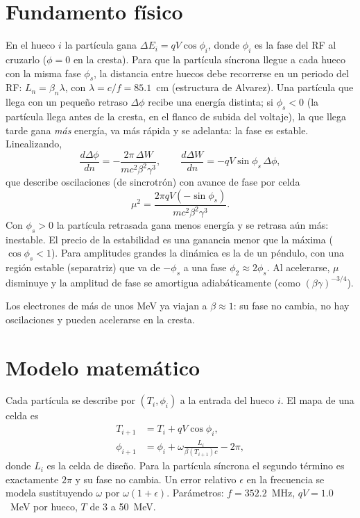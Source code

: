 \documentclass[11pt,a4paper]{article}
\begin{document}
\section{Fundamento físico}

En el hueco $i$ la partícula gana $\Delta E_i=qV\cos\phi_i$, donde $\phi_i$ es la fase del RF al cruzarlo ($\phi=0$ en la cresta).
Para que la partícula síncrona llegue a cada hueco con la misma fase $\phi_s$, la distancia entre huecos debe recorrerse en un
periodo del RF: $L_n=\beta_n\lambda$, con $\lambda=c/f=\num{85.1}$~cm (estructura de Alvarez). Una partícula que llega con un pequeño
retraso $\Delta\phi$ recibe una energía distinta; si $\phi_s<0$ (la partícula llega antes de la cresta, en el flanco de subida del
voltaje), la que llega tarde gana \emph{más} energía, va más rápida y se adelanta: la fase es estable. Linealizando,
\begin{equation}
\frac{d\Delta\phi}{dn}=-\frac{2\pi\,\Delta W}{mc^2\beta^2\gamma^3},\qquad \frac{d\Delta W}{dn}=-qV\sin\phi_s\,\Delta\phi, \label{eq:lin}
\end{equation}
que describe oscilaciones (de sincrotrón) con avance de fase por celda
\begin{equation}
\mu^2=\frac{2\pi qV(-\sin\phi_s)}{mc^2\beta^2\gamma^3}. \label{eq:mu}
\end{equation}
Con $\phi_s>0$ la partícula retrasada gana menos energía y se retrasa aún más: inestable. El precio de la estabilidad es una
ganancia menor que la máxima ($\cos\phi_s<1$). Para amplitudes grandes la dinámica es la de un péndulo, con una región estable
(separatriz) que va de $-\phi_s$ a una fase $\phi_2\approx2\phi_s$. Al acelerarse, $\mu$ disminuye y la amplitud de fase se
amortigua adiabáticamente (como $(\beta\gamma)^{-3/4}$).

Los electrones de más de unos MeV ya viajan a $\beta\approx1$: su fase no cambia, no hay oscilaciones y pueden acelerarse en la cresta.

\section{Modelo matemático}

Cada partícula se describe por $(T_i,\phi_i)$ a la entrada del hueco $i$. El mapa de una celda es
\begin{align}
T_{i+1}&=T_i+qV\cos\phi_i,\\
\phi_{i+1}&=\phi_i+\omega\frac{L_i}{\beta(T_{i+1})c}-2\pi ,
\end{align}
donde $L_i$ es la celda de diseño. Para la partícula síncrona el segundo término es exactamente $2\pi$ y su fase no cambia. Un
error relativo $\epsilon$ en la frecuencia se modela sustituyendo $\omega$ por $\omega(1+\epsilon)$. Parámetros: $f=\num{352.2}$~MHz,
$qV=\num{1.0}$~MeV por hueco, $T$ de \num{3} a \num{50}~MeV.
\end{document}
